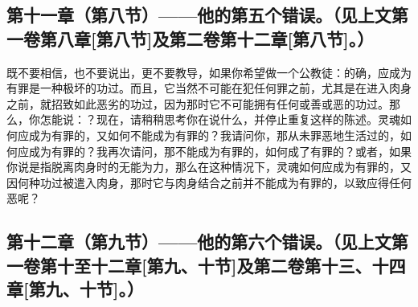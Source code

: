 
\subsection{第十一章（第八节）——他的第五个错误。（见上文第一卷第八章[第八节]及第二卷第十二章[第八节]。）}

既不要相信，也不要说出，更不要教导，如果你希望做一个公教徒：的确，应成为有罪是一种极坏的功过。而且，它当然不可能在犯任何罪之前，尤其是在进入肉身之前，就招致如此恶劣的功过，因为那时它不可能拥有任何或善或恶的功过。那么，你怎能说：？现在，请稍稍思考你在说什么，并停止重复这样的陈述。灵魂如何应成为有罪的，又如何不能成为有罪的？我请问你，那从未罪恶地生活过的，如何应成为有罪的？我再次请问，那不能成为有罪的，如何成了有罪的？或者，如果你说是指脱离肉身时的无能为力，那么在这种情况下，灵魂如何应成为有罪的，又因何种功过被遣入肉身，那时它与肉身结合之前并不能成为有罪的，以致应得任何恶呢？\par


\subsection{第十二章（第九节）——他的第六个错误。（见上文第一卷第十至十二章[第九、十节]及第二卷第十三、十四章[第九、十节]。）}

